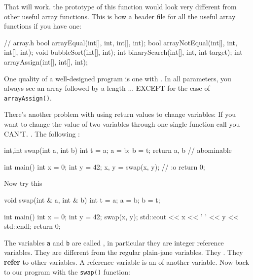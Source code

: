 That will work.  the prototype of this function would look very different from other useful array functions. This is how a header file for all the useful array functions if you have one:

\begin{consolethree}[escapeinside=||]
// array.h
bool arrayEqual(int[], int, int[], int);
bool arrayNotEqual(int[], int, int[], int);
void bubbleSort(int[], int);
int binarySearch(int[], int, int target);
int arrayAssign(int[], int[], int);
\end{consolethree}

One quality of a well-designed program is one with . In all parameters, you always see an array followed by a length ... EXCEPT for the case of \texttt{arrayAssign()}.

There's another problem with using return values to change variables: If you want to change the value of two variables through one single function call you CAN'T. . The following :

\begin{consolethree}[escapeinside=||]
int,int swap(int a, int b)
{
    int t = a;
    a = b;
    b = t;
    return a, b // abominable
}

int main()
{
    int x = 0;
    int y = 42;
    x, y = swap(x, y); // :o
    return 0;
}
\end{consolethree}


\newpage{}

Now try this

\begin{consolethree}[escapeinside=||]
void swap(int & a, int & b)
{
    int t = a;
    a = b;
    b = t;
}

int main()
{
    int x = 0;
    int y = 42;
    swap(x, y);
    std::cout << x << ' ' << y << std::endl;
    return 0;
}
\end{consolethree}

The variables \texttt{a} and \texttt{b} are called , in particular they are integer reference variables. They are different from the regular plain-jane variables. They . They \textbf{refer} to other variables. A reference variable is an  of another variable.
\newpage
Now back to our program with the \texttt{swap()} function:

